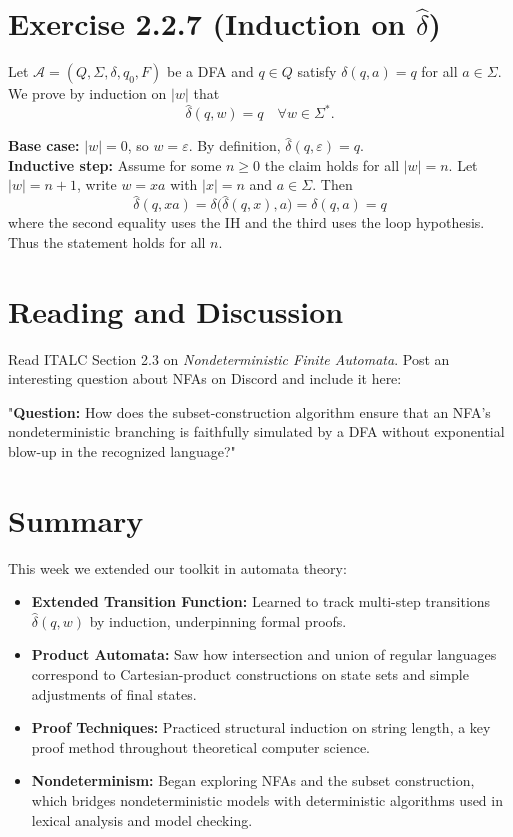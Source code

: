 \documentclass{article}
\begin{document}
    \section*{Exercise 2.2.7 (Induction on $\hat\delta$)}
    Let $\mathcal A=(Q,\Sigma,\delta,q_0,F)$ be a DFA and $q\in Q$ satisfy
    $\delta(q,a)=q$ for all $a\in\Sigma$.  We prove by induction on $|w|$ that
    \[\hat\delta(q,w)=q\quad\forall w\in\Sigma^*.\]
    
    \textbf{Base case:} $|w|=0$, so $w=\varepsilon$.  By definition,
    $\hat\delta(q,\varepsilon)=q$.\\
    \textbf{Inductive step:} Assume for some $n\ge0$ the claim holds for all
    $|w|=n$.  Let $|w|=n+1$, write $w=xa$ with $|x|=n$ and $a\in\Sigma$.  Then
    \[
      \hat\delta(q,xa)
      =\delta\bigl(\hat\delta(q,x),a\bigr)
      =\delta(q,a)
      =q
    \]
    where the second equality uses the IH and the third uses the loop hypothesis.
    Thus the statement holds for all $n$.
    
    \section*{Reading and Discussion}
    Read ITALC Section 2.3 on \emph{Nondeterministic Finite Automata}.  Post an
    interesting question about NFAs on Discord and include it here:
    
    "\textbf{Question:} How does the subset-construction algorithm ensure that
    an NFA’s nondeterministic branching is faithfully simulated by a DFA without
    exponential blow-up in the recognized language?"
    
    \section*{Summary}
    This week we extended our toolkit in automata theory:
    \begin{itemize}
      \item \textbf{Extended Transition Function:} Learned to track multi-step
        transitions $\hat\delta(q,w)$ by induction, underpinning formal proofs.
      \item \textbf{Product Automata:} Saw how intersection and union of regular
        languages correspond to Cartesian-product constructions on state sets
        and simple adjustments of final states.
      \item \textbf{Proof Techniques:} Practiced structural induction on string
        length, a key proof method throughout theoretical computer science.
      \item \textbf{Nondeterminism:} Began exploring NFAs and the subset
        construction, which bridges nondeterministic models with deterministic
        algorithms used in lexical analysis and model checking.
    \end{itemize}
    
\end{document}
